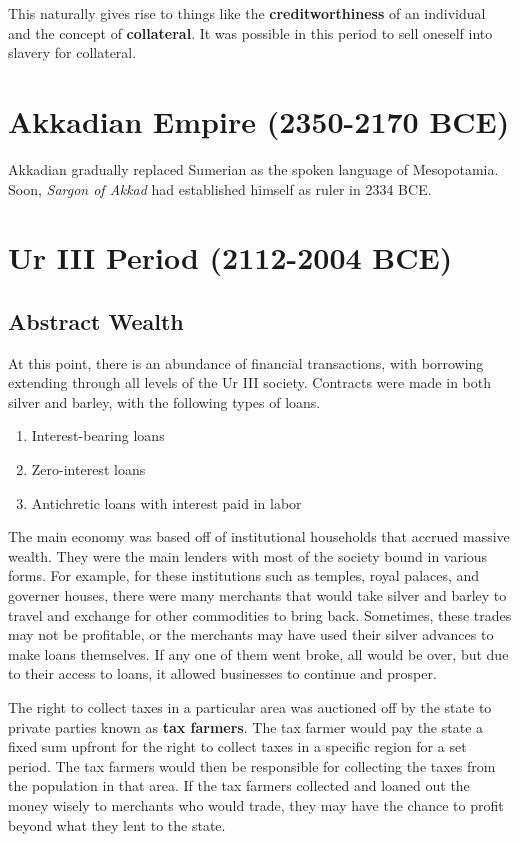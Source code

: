 \documentclass{article}
\begin{document}
    This naturally gives rise to things like the \textbf{creditworthiness} of an individual and the concept of \textbf{collateral}. It was possible in this period to sell oneself into slavery for collateral. 

\section{Akkadian Empire (2350-2170 BCE)}

  Akkadian gradually replaced Sumerian as the spoken language of Mesopotamia. Soon, \textit{Sargon of Akkad} had established himself as ruler in 2334 BCE. 

\section{Ur III Period (2112-2004 BCE)}

  \subsection{Abstract Wealth}

    At this point, there is an abundance of financial transactions, with borrowing extending through all levels of the Ur III society. Contracts were made in both silver and barley, with the following types of loans. 

    \begin{enumerate}
      \item Interest-bearing loans 
      \item Zero-interest loans 
      \item Antichretic loans with interest paid in labor
    \end{enumerate}

    The main economy was based off of institutional households that accrued massive wealth. They were the main lenders with most of the society bound in various forms. For example, for these institutions such as temples, royal palaces, and governer houses, there were many merchants that would take silver and barley to travel and exchange for other commodities to bring back. Sometimes, these trades may not be profitable, or the merchants may have used their silver advances to make loans themselves. If any one of them went broke, all would be over, but due to their access to loans, it allowed businesses to continue and prosper.  

    \begin{example}
      \label{ex:tax-farming}
      The right to collect taxes in a particular area was auctioned off by the state to private parties known as \textbf{tax farmers}. The tax farmer would pay the state a fixed sum upfront for the right to collect taxes in a specific region for a set period. The tax farmers would then be responsible for collecting the taxes from the population in that area. If the tax farmers collected and loaned out the money wisely to merchants who would trade, they may have the chance to profit beyond what they lent to the state. 
    \end{example}
\end{document}
